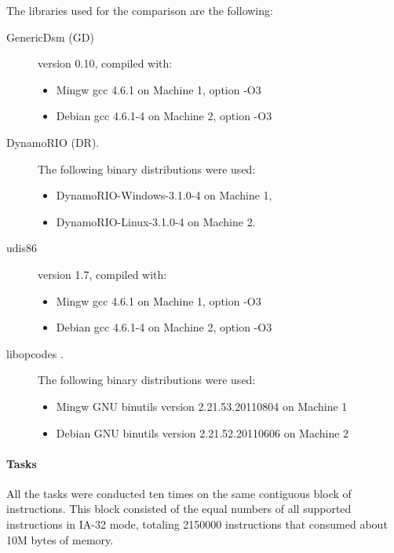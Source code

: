 \documentclass{article}
\begin{document}
The libraries used for the comparison are the following:
\begin{description}
\item[GenericDsm (GD)] version 0.10, compiled with:
  \begin{itemize}
  \item Mingw gcc 4.6.1 on Machine 1, option -O3 
  \item Debian gcc 4.6.1-4 on Machine 2, option -O3 
  \end{itemize}
  
\item[DynamoRIO \cite{dynamorio} (DR).] The following binary distributions were used:
  \begin{itemize}
  \item DynamoRIO-Windows-3.1.0-4 on Machine 1,
  \item DynamoRIO-Linux-3.1.0-4 on Machine 2.
  \end{itemize}

\item[udis86 \cite{udis86}]  version 1.7, compiled with:
  \begin{itemize} 
  \item Mingw gcc 4.6.1 on Machine 1, option -O3 
  \item Debian gcc 4.6.1-4 on Machine 2, option -O3 
  \end{itemize}

\item[libopcodes \cite{binutils}.] The following binary distributions were used:
  \begin{itemize}
  \item  Mingw GNU binutils version 2.21.53.20110804 on Machine 1
  \item  Debian GNU binutils version 2.21.52.20110606 on Machine 2
  \end{itemize}

\end{description}

\paragraph{Tasks}
\label{sec:tasks}

All the tasks were conducted ten times on the same contiguous block of
instructions.  This block consisted of the equal numbers of all
supported instructions in IA-32 mode, totaling 2150000 instructions
that consumed about 10M bytes of memory.
\end{document}
